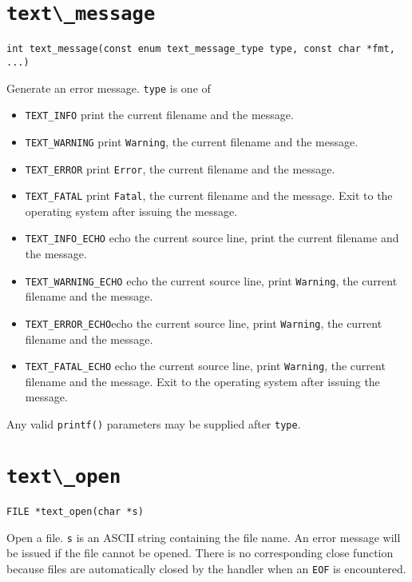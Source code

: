 \section{\protect\verb+text\_message+}
\begin{verbatim}
int text_message(const enum text_message_type type, const char *fmt, ...)
\end{verbatim}
Generate an error message. {\tt type} is one of 

\begin{itemize}
\item \verb+TEXT_INFO+ print the current filename and the message.

\item \verb+TEXT_WARNING+ print {\tt Warning}, the current filename and the message.

\item \verb+TEXT_ERROR+ print {\tt Error}, the current filename and the message.

\item \verb+TEXT_FATAL+ print {\tt Fatal}, the current filename and the
message. Exit to the operating system after issuing the message.

\item \verb+TEXT_INFO_ECHO+ echo the current source line, print the current filename and the message.

\item \verb+TEXT_WARNING_ECHO+ echo the current source line, print {\tt Warning}, the current filename and the message.

\item \verb+TEXT_ERROR_ECHO+echo the current source line, print {\tt Warning}, the current filename and the message.

\item \verb+TEXT_FATAL_ECHO+ echo the current source line, print {\tt Warning}, the current filename and the
message. Exit to the operating system after issuing the message.
\end{itemize}

Any valid \verb+printf()+ parameters may be supplied after {\tt type}.
\section{\protect\verb+text\_open+}
\begin{verbatim}
FILE *text_open(char *s)
\end{verbatim}
Open a file. {\tt s} is an ASCII string containing the file name. An
error message will be issued if the file cannot be opened. There is no
corresponding close function because files are automatically closed by
the handler when an {\tt EOF} is encountered.

